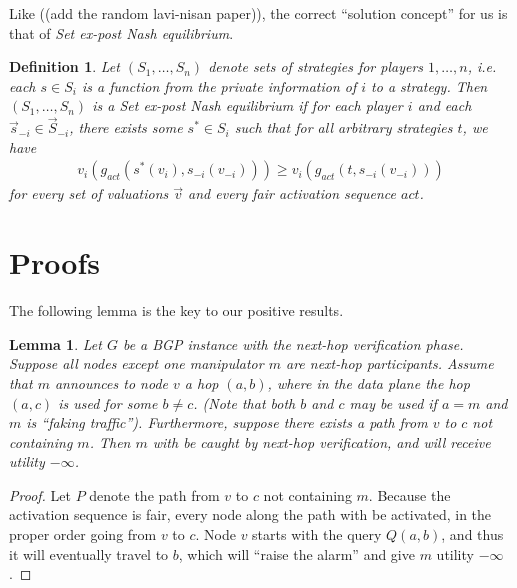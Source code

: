 \documentclass[12pt]{article}
\newtheorem{definition}{Definition}
\newtheorem{lemma}{Lemma}
\begin{document}

  Like \cite{Attraction} ((add the random lavi-nisan paper)),
  the correct ``solution concept'' for us is that of \emph{Set ex-post
  Nash equilibrium}.
  \begin{definition}
    Let $(S_1, \ldots, S_n)$ denote sets of strategies for players $1,\ldots,n$,
    i.e. each $s\in S_i$ is a function from the private information of $i$
    to a strategy.
    Then $(S_1, \ldots, S_n)$ is a \emph{Set ex-post Nash equilibrium} if
    for each player $i$ and each $\vec s _{-i} \in \vec S_{-i}$,
    there exists some $s^* \in S_i$ such that
    for \emph{all arbitrary strategies} $t$, we have
    \begin{align*}
      v_i( g_{act}( s^*(v_i), s_{-i}(v_{-i}) ) )
      \ge v_i( g_{act}( t, s_{-i}(v_{-i}) ) )
    \end{align*}
    for every set of valuations $\vec v$ and every fair activation sequence $act$.
  \end{definition}


\section{Proofs}
  The following lemma is the key to our positive results.
  \begin{lemma}
    Let $G$ be a BGP instance with the next-hop verification phase.
    Suppose all nodes except one manipulator $m$ are next-hop participants.
    Assume that $m$ announces to node $v$ a hop $(a,b)$, where in the data plane the
    hop $(a,c)$ is used for some $b\ne c$.
    (Note that both $b$ and $c$ may be used if $a=m$ and $m$ is ``faking traffic'').
    Furthermore, suppose there exists a path from $v$ to $c$ not containing $m$.
    Then $m$ with be caught by next-hop verification, and will
    receive utility $-\infty$.
  \end{lemma}
  \begin{proof}
    Let $P$ denote the path from $v$ to $c$ not containing $m$.
    Because the activation sequence is fair, every node along the path with
    be activated, in the proper order going from $v$ to $c$.
    Node $v$ starts with the query $Q(a,b)$, and thus it will eventually travel
    to $b$, which will ``raise the alarm'' and give $m$ utility $-\infty$.
  \end{proof}
\end{document}
